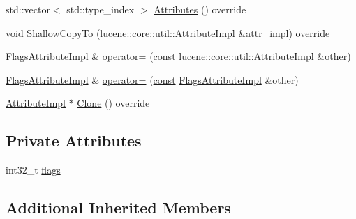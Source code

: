 \begin{DoxyCompactItemize}
\item 
std\+::vector$<$ std\+::type\+\_\+index $>$ \mbox{\hyperlink{classlucene_1_1core_1_1analysis_1_1tokenattributes_1_1FlagsAttributeImpl_a3cdbd466551489b6f35ad51aa5ee2255}{Attributes}} () override
\item 
void \mbox{\hyperlink{classlucene_1_1core_1_1analysis_1_1tokenattributes_1_1FlagsAttributeImpl_a9c6a676eb175556a2eea6afaae666f8d}{Shallow\+Copy\+To}} (\mbox{\hyperlink{classlucene_1_1core_1_1util_1_1AttributeImpl}{lucene\+::core\+::util\+::\+Attribute\+Impl}} \&attr\+\_\+impl) override
\item 
\mbox{\hyperlink{classlucene_1_1core_1_1analysis_1_1tokenattributes_1_1FlagsAttributeImpl}{Flags\+Attribute\+Impl}} \& \mbox{\hyperlink{classlucene_1_1core_1_1analysis_1_1tokenattributes_1_1FlagsAttributeImpl_a41dfb20fafc327e7832e639695b453fa}{operator=}} (\mbox{\hyperlink{ZlibCrc32_8h_a2c212835823e3c54a8ab6d95c652660e}{const}} \mbox{\hyperlink{classlucene_1_1core_1_1util_1_1AttributeImpl}{lucene\+::core\+::util\+::\+Attribute\+Impl}} \&other)
\item 
\mbox{\hyperlink{classlucene_1_1core_1_1analysis_1_1tokenattributes_1_1FlagsAttributeImpl}{Flags\+Attribute\+Impl}} \& \mbox{\hyperlink{classlucene_1_1core_1_1analysis_1_1tokenattributes_1_1FlagsAttributeImpl_a32b03acbc1300103b4d96bd7e1a6ca2c}{operator=}} (\mbox{\hyperlink{ZlibCrc32_8h_a2c212835823e3c54a8ab6d95c652660e}{const}} \mbox{\hyperlink{classlucene_1_1core_1_1analysis_1_1tokenattributes_1_1FlagsAttributeImpl}{Flags\+Attribute\+Impl}} \&other)
\item 
\mbox{\hyperlink{classlucene_1_1core_1_1util_1_1AttributeImpl}{Attribute\+Impl}} $\ast$ \mbox{\hyperlink{classlucene_1_1core_1_1analysis_1_1tokenattributes_1_1FlagsAttributeImpl_aa920978da58dffbf7eb16bfa5e5f84c4}{Clone}} () override
\end{DoxyCompactItemize}
\subsection*{Private Attributes}
\begin{DoxyCompactItemize}
\item 
int32\+\_\+t \mbox{\hyperlink{classlucene_1_1core_1_1analysis_1_1tokenattributes_1_1FlagsAttributeImpl_ac0a726a7b082414bcac0d9a5dc9ab4bb}{flags}}
\end{DoxyCompactItemize}
\subsection*{Additional Inherited Members}


